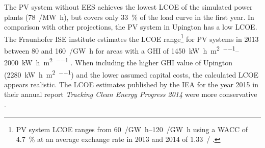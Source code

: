 The \ac{PV} system without \ac{EES} achieves the lowest \ac{LCOE} of the simulated power plants (\SI{78}{\usd/\mega\watt\hour}), but covers only \SI{33}{\percent} of the load curve in the first year. In comparison with other projections, the \ac{PV} system in Upington has a low \ac{LCOE}. The Fraunhofer ISE institute estimates the \ac{LCOE} range\footnote{\ac{PV} system \ac{LCOE} ranges from \SIrange{60}{120}{\eur/\giga\watt\hour} using a \ac{WACC} of \SI{4.7}{\percent} \cite{FraunhoferISE2013} at an average exchange rate in 2013 and 2014 of \SI{1.33}{\usd/\eur} \cite{StatistaGmbH2015}.} for \ac{PV} systems in 2013 between \num{80} and \SI{160}{\usd/\giga\watt\hour} for areas with a \ac{GHI} of \SIrange{1450}{2000}{\kilo\watt\hour\per\square\metre\per\year} \cite{FraunhoferISE2013}. When including the higher \ac{GHI} value of Upington (\SI{2280}{\kilo\watt\hour\per\square\metre\per\year}) and the lower assumed capital costs, the calculated \ac{LCOE} appears realistic. The \ac{LCOE} estimates published by the \ac{IEA} for the year 2015 in their annual report \emph{Tracking Clean Energy Progress 2014} were more conservative \cite{IEA2014c}.


